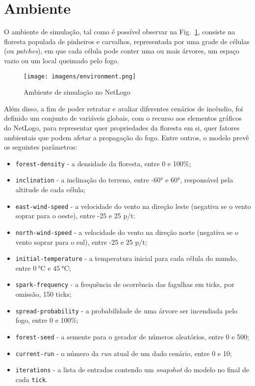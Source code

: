 \section{Ambiente}\label{sec:environment}

O ambiente de simulação, tal como é possível observar na Fig.~\ref{fig:environment}, consiste na floresta populada de pinheiros e carvalhos, representada por uma grade de células (ou \textit{patches}), em que cada célula pode conter uma ou mais árvores, um espaço vazio ou um local queimado pelo fogo.

\begin{figure}[htbp]
    \centering
    \texttt{[image: imagens/environment.png]}
    \caption{Ambiente de simulação no NetLogo}
    \label{fig:environment}
\end{figure}

Além disso, a fim de poder retratar e avaliar diferentes cenários de incêndio, foi definido um conjunto de variáveis globais, com o recurso aos elementos gráficos do NetLogo, para representar quer propriedades da floresta em si, quer fatores ambientais que podem afetar a propagação do fogo. Entre outros, o modelo prevê os seguintes parâmetros:

\begin{itemize}
    \item \texttt{forest-density} - a densidade da floresta, entre 0 e 100\%;
    \item \texttt{inclination} - a inclinação do terreno, entre \ang{-60} e \ang{60}, responsável pela altitude de cada célula;
    \item \texttt{east-wind-speed} - a velocidade do vento na direção leste (negativa se o vento soprar para o oeste), entre -25 e 25 p/t:
    \item \texttt{north-wind-speed} - a velocidade do vento na direção norte (negativa se o vento soprar para o sul), entre -25 e 25 p/t;
    \item \texttt{initial-temperature} - a temperatura inicial para cada célula do mundo, entre $\SI{0}{\degreeCelsius}$ e $\SI{45}{\degreeCelsius}$;
    \item \texttt{spark-frequency} - a frequência de ocorrência das fagulhas em ticks, por omissão, 150 ticks;
    \item \texttt{spread-probability} - a probabilidade de uma árvore ser incendiada pelo fogo, entre 0 e 100\%;
    \item \texttt{forest-seed} - a semente para o gerador de números aleatórios, entre 0 e 500;
    \item \texttt{current-run} - o número da \textit{run} atual de um dado cenário, entre 0 e 10;
    \item \texttt{iterations} - a lista de entradas contendo um \textit{snapshot} do modelo no final de cada \texttt{tick}.
\end{itemize}

